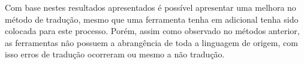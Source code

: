 \par
Com base nestes resultados apresentados é possível apresentar uma melhora no método de tradução, mesmo que uma ferramenta tenha em adicional tenha sido colocada para este processo. Porém, assim como observado no métodos anterior, as ferramentas não possuem a abrangência de toda a linguagem de origem, com isso erros de tradução ocorreram ou mesmo a não tradução.

\par
